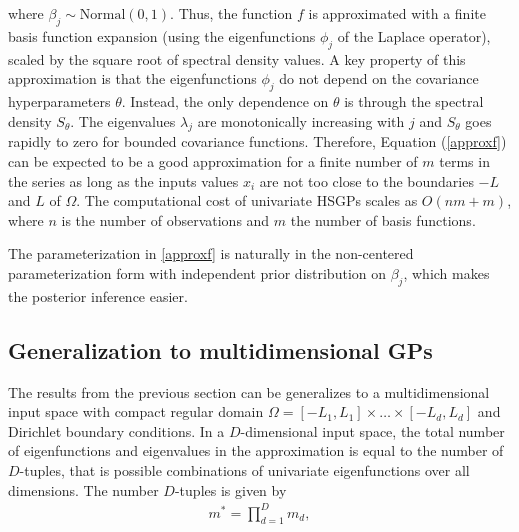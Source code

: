 \documentclass[]{interact}
\theoremstyle{plain}%
\theoremstyle{definition}
\theoremstyle{remark}
\begin{document}
\noindent where $\beta_j \sim \text{Normal}(0,1)$. Thus, the function $f$ is approximated with a finite basis function expansion (using the eigenfunctions $\phi_j$ of the Laplace operator), scaled by the square root of spectral density values. A key property of this approximation is that the eigenfunctions $\phi_j$ do not depend on the covariance hyperparameters $\theta$. Instead, the only dependence on $\theta$ is through the spectral density $S_{\theta}$. The eigenvalues $\lambda_j$ are monotonically increasing with $j$ and $S_{\theta}$ goes rapidly to zero for bounded covariance functions. Therefore, Equation (\ref{approxf}) can be expected to be a good approximation for a finite number of $m$ terms in the series as long as the inputs values $x_i$ are not too close to the boundaries $-L$ and $L$ of $\Omega$. The computational cost of univariate HSGPs scales as $O(nm + m)$, where $n$ is the number of observations and $m$ the number of basis functions.

The parameterization in \ref{approxf} is naturally in the non-centered
parameterization form with independent prior distribution on
$\beta_j$, which makes the posterior inference easier.

\subsection{Generalization to multidimensional GPs}

The results from the previous section can be generalizes to a multidimensional input space with compact regular domain $\Omega=[-L_1,L_1] \times \dots \times [-L_d,L_d]$ and Dirichlet boundary conditions. 
In a $D$-dimensional input space, the total number of eigenfunctions and eigenvalues in the approximation is equal to the number of $D$-tuples, that is possible combinations of univariate eigenfunctions over all dimensions. The number $D$-tuples is given by 
%
\begin{align} \label{m_multi}
m^{\ast} = \prod_{d=1}^{D} m_d,
\end{align}
\end{document}
